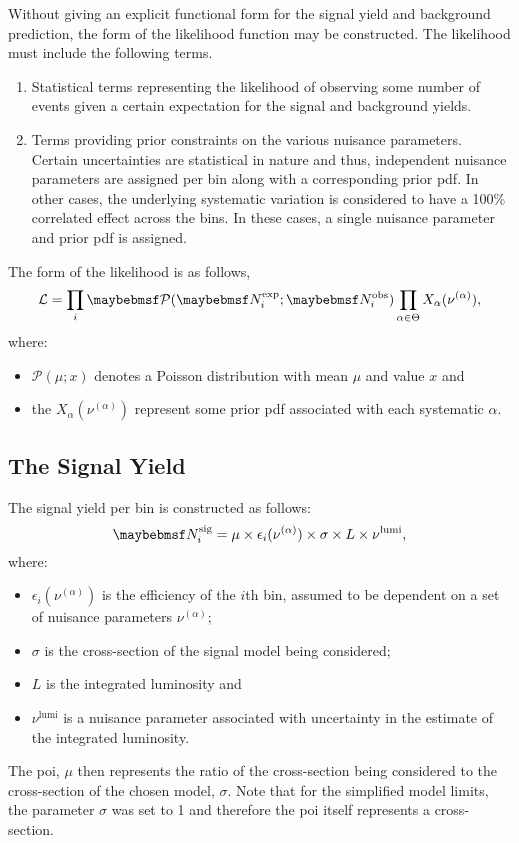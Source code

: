 Without giving an explicit functional form for the signal yield and background
prediction, the form of the likelihood function may be constructed. The
likelihood must include the following terms.
\begin{enumerate}
\item Statistical terms representing the likelihood of observing some number of
  events given a certain expectation for the signal and background yields.
\item Terms providing prior constraints on the various nuisance
  parameters. Certain uncertainties are statistical in nature and thus,
  independent nuisance parameters are assigned per bin along with a
  corresponding prior \ac{pdf}. In other cases,
  the underlying systematic variation is considered to have a 100\% correlated
  effect across the bins. In these cases, a single nuisance parameter and prior
  \ac{pdf} is assigned.
\end{enumerate}

The form of the likelihood is as follows,
\begin{equation*}
\mathcal{L} = \prod_i \Poisson(\NExpi ; \NObsi)
\prod_{\alpha \in \Theta}  X_\alpha(\nu^{(\alpha)}),
\end{equation*}
where:
\begin{itemize}
\item $\mathcal{P}(\mu;x)$ denotes a Poisson distribution with mean $\mu$ and value
$x$ and
\item the $X_\alpha(\nu^{(\alpha)})$ represent some prior \ac{pdf} associated with
  each systematic $\alpha$.
\end{itemize}

\subsection{The Signal Yield}
The signal yield per bin is constructed as follows:
\begin{equation*}
\NSigi = \mu \times \epsilon_i(\nu^{(\alpha)}) \times \sigma \times L \times \nu^{\textrm{lumi}},
\end{equation*}
where:
\begin{itemize}
\item $\epsilon_i(\nu^{(\alpha)})$ is the efficiency of the $i$th bin, assumed to be
  dependent on a set of nuisance parameters $\nu^{(\alpha)}$;
\item $\sigma$ is the cross-section of the signal model being considered;
\item $L$ is the integrated luminosity and
\item $\nu^{\textrm{lumi}}$ is a nuisance parameter associated with uncertainty
  in the estimate of the integrated luminosity.
\end{itemize}
The \ac{poi}, $\mu$ then represents the ratio of the cross-section being
considered to the cross-section of the chosen model, $\sigma$. Note that for the
simplified model limits, the parameter $\sigma$ was set to 1 and therefore the
\ac{poi} itself represents a cross-section.

